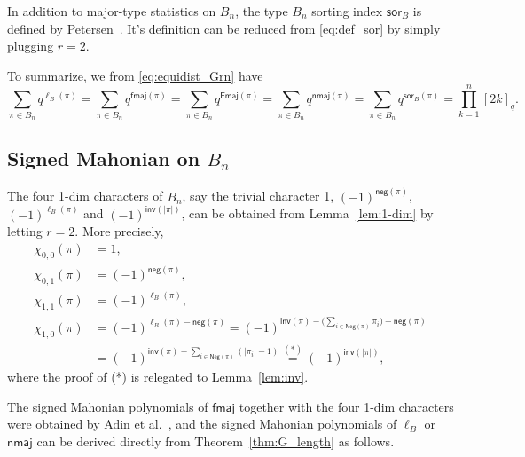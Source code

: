 \documentclass[a4paper, reqno, 11pt]{amsart}
\newcommand{\inv}{{\textsf{inv}}}
\newcommand{\Nega}{{\textsf{Neg}}}
\newcommand{\nega}{{\textsf{neg}}}
\newcommand{\fmaj}{{\textsf{fmaj}}}
\newcommand{\Fmaj}{{\textsf{Fmaj}}}
\newcommand{\nmaj}{{\textsf{nmaj}}}
\newcommand{\sor}{{\textsf{sor}}}
\numberwithin{equation}{section}
\begin{document}
In addition to major-type statistics on $B_n$, the type $B_n$ sorting index $\sor_B$ is defined by Petersen~\cite{Petersen_11}.
It's definition can be reduced from \ref{eq:def_sor} by simply plugging $r=2$.

To summarize, we from \eqref{eq:equidist_Grn} have
\begin{equation}\label{eq:B_equidist}
\sum_{\pi\in B_n}q^{\ell_B(\pi)}=\sum_{\pi\in B_n}q^{\fmaj(\pi)}
=\sum_{\pi\in B_n}q^{\Fmaj(\pi)}=\sum_{\pi\in B_n}q^{\nmaj(\pi)}=\sum_{\pi\in B_n}q^{\sor_B(\pi)}=\prod_{k=1}^{n}[2k]_q.
\end{equation}


\subsection{Signed Mahonian on $B_n$}\label{Sec:Bn_SM}
The four 1-dim characters of $B_n$, say the trivial character 1, $(-1)^{\nega(\pi)}$, $(-1)^{\ell_B(\pi)}$ and $(-1)^{\inv(|\pi|)}$, can be obtained from Lemma~\ref{lem:1-dim} by letting $r=2$.
More precisely,
\begin{align*}
\chi_{0,0}(\pi) &= 1, \\
\chi_{0,1}(\pi) &= (-1)^{\nega(\pi)}, \\
\chi_{1,1}(\pi) &= (-1)^{\ell_B(\pi)}, \\
\chi_{1,0}(\pi) &= (-1)^{\ell_B(\pi)-\nega(\pi)} = (-1)^{\inv(\pi)-\big(\sum_{i\in\Nega(\pi)}\pi_i\big) - \nega(\pi)} \\
&= (-1)^{\inv(\pi)+\sum_{i\in\Nega(\pi)}(|\pi_i|-1)} \stackrel{(*)}{=} (-1)^{\inv(|\pi|)},
\end{align*}
where the proof of (*) is relegated to Lemma~\ref{lem:inv}.

The signed Mahonian polynomials of $\fmaj$ together with the four 1-dim characters were obtained by Adin et al.~\cite{Adin_Gessel_Roichman_05}, and the signed Mahonian polynomials of $\ell_B$ or $\nmaj$ can be derived directly from Theorem~\ref{thm:G_length} as follows.
\end{document}
